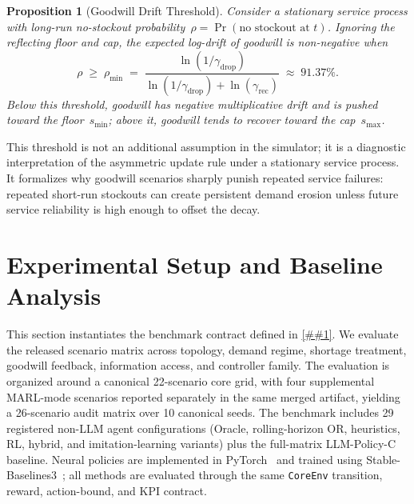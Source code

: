 \documentclass[10pt,a4paper]{article}
\newtheorem{proposition}{Proposition}
\providecommand{\Cref}[1]{\ref{##1}}
\begin{document}
\begin{proposition}[Goodwill Drift Threshold]\label{prop:goodwill}
  Consider a stationary service process with long-run no-stockout
  probability~$\rho = \Pr(\text{no stockout at }t)$. Ignoring the
  reflecting floor and cap, the expected log-drift of goodwill is
  non-negative when
  \[
    \rho \;\geq\; \rho_{\min}
      \;=\; \frac{\ln(1/\gamma_{\text{drop}})}
                  {\ln(1/\gamma_{\text{drop}})
                   + \ln(\gamma_{\text{rec}})}
      \;\approx\; 91.37\%.
  \]
  Below this threshold, goodwill has negative multiplicative drift and
  is pushed toward the floor~$s_{\min}$; above it, goodwill tends to
  recover toward the cap~$s_{\max}$.
\end{proposition}

This threshold is not an additional assumption in the simulator; it is
a diagnostic interpretation of the asymmetric update rule under a
stationary service process. It formalizes why goodwill scenarios sharply
punish repeated service failures: repeated short-run stockouts can
create persistent demand erosion unless future service reliability is
high enough to offset the decay.

\section{Experimental Setup and Baseline Analysis}\label{sec:results}

This section instantiates the benchmark contract defined in
\Cref{sec:framework}. We evaluate the released scenario matrix across
topology, demand regime, shortage treatment, goodwill feedback,
information access, and controller family. The evaluation is organized
around a canonical 22-scenario core grid, with four supplemental
MARL-mode scenarios reported separately in the same merged artifact,
yielding a 26-scenario audit matrix over 10 canonical seeds. The
benchmark includes 29 registered non-LLM agent configurations (Oracle,
rolling-horizon OR, heuristics, RL, hybrid, and imitation-learning
variants) plus the full-matrix LLM-Policy-C baseline. Neural policies are
implemented in PyTorch~\citep{paszke2019} and trained using
Stable-Baselines3~\citep{raffin2021}; all methods are evaluated through
the same \texttt{CoreEnv} transition, reward, action-bound, and KPI
contract.
\end{document}
